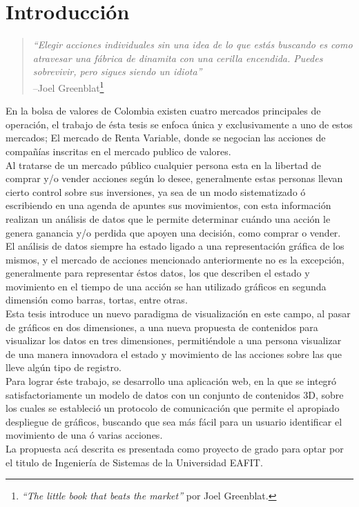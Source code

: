 \chapter{Introducción}

\begin{quote} \textit{``Elegir acciones individuales sin una idea de lo que estás buscando es como atravesar una fábrica de dinamita con una cerilla encendida. Puedes sobrevivir, pero sigues siendo un idiota''}
  \\ --Joel Greenblat\footnote{\textit{``The little book that beats the market''} por Joel Greenblat.}
\end{quote} 
En la bolsa de valores de Colombia existen cuatro mercados principales de operación, el trabajo de ésta tesis se enfoca única y exclusivamente a uno de estos mercados; El mercado de Renta Variable, donde se negocian las acciones de compañías inscritas en el mercado publico de valores.\\

Al tratarse de un mercado público cualquier persona esta en la libertad de comprar y/o vender acciones según lo desee, generalmente estas personas llevan cierto control sobre sus inversiones, ya sea de un modo sistematizado ó escribiendo en una agenda de apuntes sus movimientos, con esta información realizan un análisis de datos que le permite determinar cuándo una acción le genera ganancia y/o perdida que apoyen una decisión, como comprar o vender.\\

El análisis de datos siempre ha estado ligado a una representación gráfica de los mismos, y el mercado de acciones mencionado anteriormente no es la excepción, generalmente para representar éstos datos, los que describen el estado y movimiento en el tiempo de una acción se han utilizado gráficos en segunda dimensión como barras, tortas, entre otras.\\

Esta tesis introduce un nuevo paradigma de visualización en este campo, al pasar de gráficos en dos dimensiones, a una nueva propuesta de contenidos para visualizar los datos en tres dimensiones, permitiéndole a una persona visualizar de una manera innovadora el estado y movimiento de las acciones sobre las que lleve algún tipo de registro.\\

Para lograr éste trabajo, se desarrollo una aplicación web, en la que se integró satisfactoriamente un modelo de datos con un conjunto de contenidos 3D, sobre los cuales se estableció un protocolo de comunicación que permite el apropiado despliegue de gráficos, buscando que sea más fácil para un usuario identificar el movimiento de una ó varias acciones.\\

La propuesta acá descrita es presentada como proyecto de grado para optar por el titulo de Ingeniería de Sistemas de la Universidad EAFIT.


